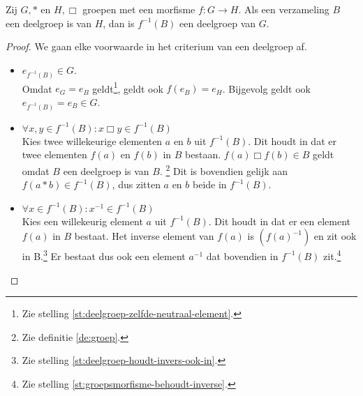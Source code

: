 \documentclass[main.tex]{subfiles}
\begin{document}
\begin{st}
  \label{st:fbm-deelgroep-g}
  Zij $G,*$ en $H,\Box$ groepen met een morfisme $f: G \rightarrow H$.
  Als een verzameling $B$ een deelgroep is van $H$, dan is $f^{-1}(B)$ een deelgroep van $G$.

  \begin{proof}
    We gaan elke voorwaarde in het criterium van een deelgroep af.
    \begin{itemize}
    \item $e_{f^{-1}(B)} \in G$.\\
      Omdat $e_{G} = e_{B}$ geldt\footnote{Zie stelling \ref{st:deelgroep-zelfde-neutraal-element}.}, geldt ook $f(e_{B}) = e_{H}$.
      Bijgevolg geldt ook $e_{f^{-1}(B)} = e_{B} \in G$. 
    \item $\forall x,y \in f^{-1}(B): x \Box y \in f^{-1}(B) $\\
      Kies twee willekeurige elementen $a$ en $b$ uit $f^{-1}(B)$.
      Dit houdt in dat er twee elementen $f(a)$ en $f(b)$ in $B$ bestaan.
      $f(a) \Box f(b) \in B$ geldt omdat $B$ een deelgroep is van $B$. \footnote{Zie definitie \ref{de:groep}.}
      Dit is bovendien gelijk aan $f(a * b) \in f^{-1}(B)$, dus zitten $a$ en $b$ beide in $f^{-1}(B)$.
    \item $\forall x \in f^{-1}(B): x^{-1} \in f^{-1}(B)$\\
      Kies een willekeurig element $a$ uit $f^{-1}(B)$.
      Dit houdt in dat er een element $f(a)$ in $B$ bestaat.
      Het inverse element van $f(a)$ is $(f(a)^{-1})$ en zit ook in B.\footnote{Zie stelling \ref{st:deelgroep-houdt-invers-ook-in}.}
      Er bestaat dus ook een element $a^{-1}$ dat bovendien in $f^{-1}(B)$ zit.\footnote{Zie stelling \ref{st:groepsmorfisme-behoudt-inverse}.}
    \end{itemize}
  \end{proof}
\end{st}
\end{document}
